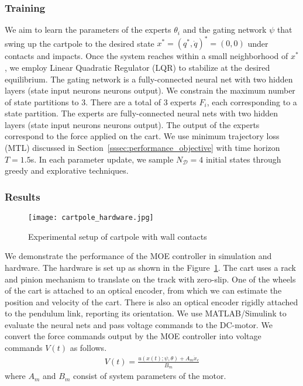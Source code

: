 \subsubsection{Training}
\label{sssec:cartpole_training}

We aim to learn the parameters of the experts $\theta_i$ and the gating network
$\psi$ that swing up the cartpole to the desired state $x^* = (q^*, \dot{q})^* =
(0, 0)$ under contacts and impacts.
%
Once the system reaches within a small neighborhood of $x^*$, we employ Linear
Quadratic Regulator (LQR) to stabilize at the desired equilibrium.
%
The gating network is a fully-connected neural net with two hidden layers (state
input  neurons  neurons  output).
% 
We constrain the maximum number of state partitions to 3.
%
There are a total of 3 experts $F_i$, each corresponding to a state
partition.
%
The experts are fully-connected neural nets with two hidden layers (state input
 neurons  neurons  output).
%
The output of the experts correspond to the force applied on the cart.
%
We use minimum trajectory loss (MTL) discussed in
Section~\ref{sssec:performance_objective} with time horizon $T=1.5$s.
%
In each parameter update, we sample $N_{\mathcal{D}}=4$ initial states through
greedy and explorative techniques.
%

\subsubsection{Results}
\begin{figure}[tb]
    \centering
    \texttt{[image: cartpole\_hardware.jpg]}
    \caption{Experimental setup of cartpole with wall contacts}
    \label{fig:cartpole_hardware}
\end{figure}

We demonstrate the performance of the MOE controller in simulation and hardware. 
%
The hardware is set up as shown in the Figure~\ref{fig:cartpole_hardware}.
% 
The cart uses a rack and pinion mechanism to translate on the track with
zero-slip.
%
One of the wheels of the cart is attached to an optical encoder, from which we
can estimate the position and velocity of the cart.
%
There is also an optical encoder rigidly attached to the pendulum link,
reporting its orientation. 
%
%
We use MATLAB/Simulink to evaluate the neural nets and pass voltage commands to
the DC-motor.
%
We convert the force commands output by the MOE controller into voltage
commands $V(t)$ as follows.
\begin{align*}
    V(t) = \frac{u(x(t); \psi, \theta) + A_m \dot{x}_c}{B_m}
\end{align*} 
\noindent where $A_m$ and $B_m$ consist of system parameters of the motor.

